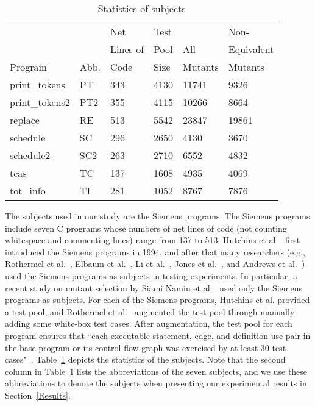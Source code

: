\begin{table}[t]
\caption{\label{tab:Subjects} Statistics of subjects} \centering
\hspace*{-0.2cm}
\begin{tabular}{|p{5.4em}|p{1.8em}|p{3.5em}|p{1.9em}|p{3.2em}|p{4.1em}|}
  \hline
  ~ & ~ &Net  & Test & ~ & Non-\\
  ~ & ~ & Lines of  &  Pool  & All & Equivalent\\
  Program & Abb. & Code & Size & Mutants & Mutants\\
  \hline
  print\_tokens &PT&343 &4130 &11741 &9326\\
  \hline
  print\_tokens2 &PT2&355 &4115 &10266 &8664\\
  \hline
  replace &RE&513 &5542 &23847 &19861\\
  \hline
  schedule &SC&296 &2650 &4130 &3670 \\
  \hline
  schedule2 &SC2&263 &2710 &6552 &4832 \\
  \hline
  tcas &TC&137 &1608 &4935 &4069\\
  \hline
  tot\_info &TI&281 &1052 &8767 &7876\\
  \hline
\end{tabular}
\vspace{-4ex}
\end{table}

The subjects used in our study are the Siemens programs. The
Siemens programs include seven C programs whose numbers of net
lines of code (not counting whitespace and commenting lines) range
from 137 to 513. Hutchins et al.~\cite{Hutchins:94} first
introduced the Siemens programs in 1994, and after that many
researchers (e.g., Rothermel et
al.~\cite{Rothermel:98,Rothermel:99}, Elbaum et
al.~\cite{Elbaum:00}, Li et al.~\cite{Li:07}, Jones et
al.~\cite{Jones:05}, and Andrews et
al.~\cite{Andrews:05,SiamiNamin:08}) used the Siemens programs as
subjects in testing experiments. In particular, a recent study on
mutant selection by Siami Namin et al.~\cite{SiamiNamin:08} used
only the Siemens programs as subjects. For each of the Siemens
programs, Hutchins et al. provided a test pool, and Rothermel et
al.~\cite{Rothermel:98} augmented the test pool through manually
adding some white-box test cases. After augmentation, the test
pool for each program ensures that ``each executable statement,
edge, and definition-use pair in the base program or its control
flow graph was exercised by at least 30 test
cases"~\cite{Rothermel:98}. Table~\ref{tab:Subjects} depicts the
statistics of the subjects. Note that the second column in
Table~\ref{tab:Subjects} lists the abbreviations of the seven
subjects, and we use these abbreviations to denote the subjects
when presenting our experimental results in Section~\ref{Results}.

